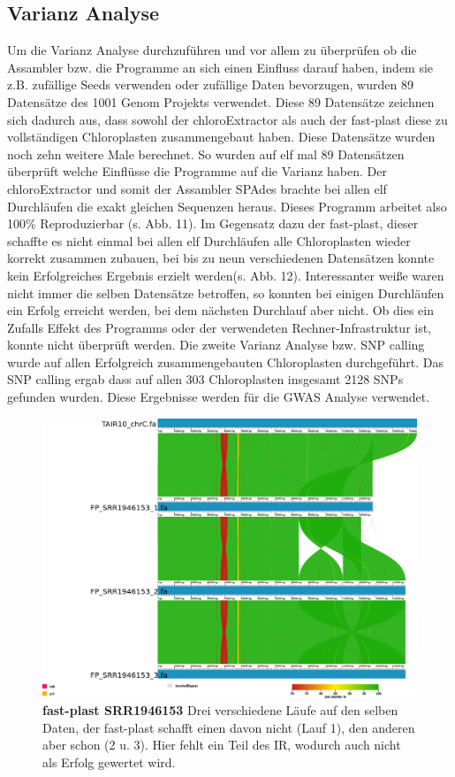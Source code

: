 \documentclass{scrartcl}
\begin{document}
\subsection{Varianz Analyse}
\label{sec-4-7}
Um die Varianz Analyse durchzuführen und vor allem zu überprüfen ob die Assambler bzw. die Programme an sich einen Einfluss darauf haben, indem sie z.B. zufällige Seeds verwenden oder zufällige Daten bevorzugen, wurden 89 Datensätze
des 1001 Genom Projekts verwendet. Diese 89 Datensätze zeichnen sich dadurch aus, dass sowohl der chloroExtractor als auch der fast-plast diese zu vollständigen Chloroplasten zusammengebaut haben. Diese Datensätze
wurden noch zehn weitere Male berechnet. So wurden auf elf mal 89 Datensätzen überprüft welche Einflüsse die Programme auf die Varianz haben. Der chloroExtractor und somit der Assambler SPAdes brachte bei allen elf
Durchläufen die exakt gleichen Sequenzen heraus. Dieses Programm arbeitet also 100\% Reproduzierbar (s. Abb. 11). Im Gegensatz dazu der fast-plast, dieser schaffte es nicht einmal bei allen elf Durchläufen alle Chloroplasten wieder
korrekt zusammen zubauen, bei bis zu neun verschiedenen Datensätzen konnte kein Erfolgreiches Ergebnis erzielt werden(s. Abb. 12). Interessanter weiße waren nicht immer die selben Datensätze betroffen, 
so konnten bei einigen Durchläufen
ein Erfolg erreicht werden, bei dem nächsten Durchlauf aber nicht. Ob dies ein Zufalls Effekt des Programms oder der verwendeten Rechner-Infrastruktur ist, konnte nicht überprüft werden.
Die zweite Varianz Analyse bzw. SNP calling wurde auf allen Erfolgreich zusammengebauten Chloroplasten durchgeführt. Das SNP calling ergab dass auf allen 303 Chloroplasten insgesamt 2128 SNPs gefunden wurden. 
Diese Ergebnisse werden für die GWAS Analyse verwendet.
\begin{figure}
\includegraphics[width=.9\linewidth]{./SRR1946153_FP_1.png}
\caption[fast-plast SRR1946153]{\textbf{fast-plast SRR1946153} Drei verschiedene Läufe auf den selben Daten, der fast-plast schafft einen davon nicht (Lauf 1), den anderen aber schon (2 u. 3). Hier fehlt ein Teil des IR, wodurch auch nicht als Erfolg gewertet wird. }
\end{figure}
\end{document}
